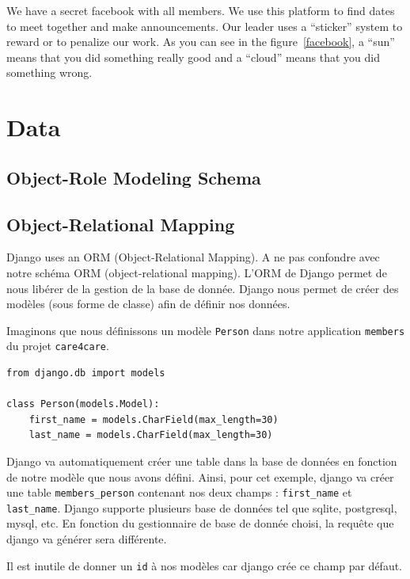 \documentclass[11pt, a4paper]{article}   	%
\begin{document}
We have a secret facebook with all members.
We use this platform to find dates to meet together and make announcements.
Our leader uses a \enquote{sticker} system to reward or to penalize our work. As you can see in the figure~\ref{facebook}, a \enquote{sun} means that you did something really good and a \enquote{cloud} means that you did something wrong.





\section{Data}
\subsection{Object-Role Modeling Schema}


\subsection{Object-Relational Mapping}
Django uses an ORM (Object-Relational Mapping).
A ne pas confondre avec notre schéma ORM (object-relational mapping).
L'ORM de Django permet de nous libérer de la gestion de la base de donnée.
Django nous permet de créer des modèles (sous forme de classe) afin de définir nos données.

Imaginons que nous définissons un modèle \texttt{Person} dans notre application \texttt{members} du projet \texttt{care4care}.

\begin{lstlisting}[frame=single, caption=file care4care/members/models.py]  % Start your code-block
from django.db import models

class Person(models.Model):
    first_name = models.CharField(max_length=30)
    last_name = models.CharField(max_length=30)
\end{lstlisting}

Django va automatiquement créer une table dans la base de données en fonction de notre modèle que nous avons défini.
Ainsi, pour cet exemple, django va créer une table \texttt{members\_person} contenant nos deux champs : \texttt{first\_name} et \texttt{last\_name}.
Django supporte plusieurs base de données tel que sqlite, postgresql, mysql, etc.
En fonction du gestionnaire de base de donnée choisi, la requête que django va générer sera différente. 

Il est inutile de donner un \texttt{id} à nos modèles car django crée ce champ par défaut.
\end{document}
